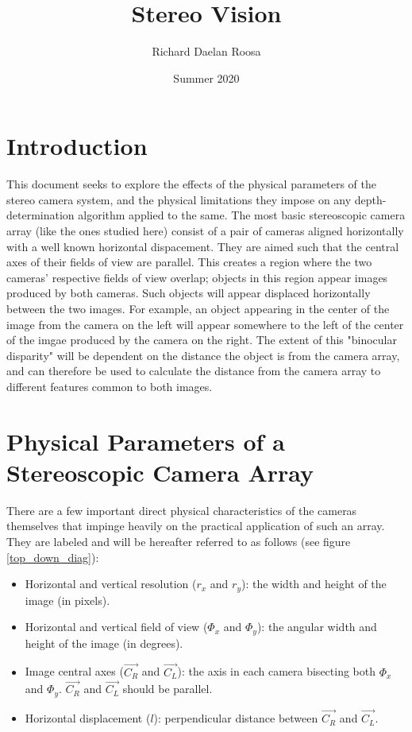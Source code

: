 \documentclass{article}
\title{Stereo Vision}
\author{Richard Daelan Roosa}
\date{Summer 2020}
\begin{document}
\maketitle

\section{Introduction}
This document seeks to explore the effects of the physical parameters of the stereo camera system, and the physical limitations they impose on any depth-determination algorithm applied to the same.
The most basic stereoscopic camera array (like the ones studied here) consist of a pair of cameras aligned horizontally with a well known horizontal dispacement.
They are aimed such that the central axes of their fields of view are parallel.
This creates a region where the two cameras' respective fields of view overlap; objects in this region appear images produced by both cameras.
Such objects will appear displaced horizontally between the two images.
For example, an object appearing in the center of the image from the camera on the left will appear somewhere to the left of the center of the imgae produced by the camera on the right.
The extent of this "binocular disparity" will be dependent on the distance the object is from the camera array, and can therefore be used to calculate the distance from the camera array to different features common to both images.

\section{Physical Parameters of a Stereoscopic Camera Array}
There are a few important direct physical characteristics of the cameras themselves that impinge heavily on the practical application of such an array.
They are labeled and will be hereafter referred to as follows (see figure \ref{top_down_diag}):

\begin{itemize}
    \item Horizontal and vertical resolution ($r_x$ and $r_y$): the width and height of the image (in pixels). 
    \item Horizontal and vertical field of view ($\Phi_x$ and $\Phi_y$): the angular width and height of the image (in degrees).
    \item Image central axes ($\vec{C_R}$ and $\vec{C_L}$): the axis in each camera bisecting both $\Phi_x$ and $\Phi_y$. $\vec{C_R}$ and $\vec{C_L}$ should be parallel.
    \item Horizontal displacement ($l$): perpendicular distance between $\vec{C_R}$ and $\vec{C_L}$.
\end{itemize}
\end{document}
